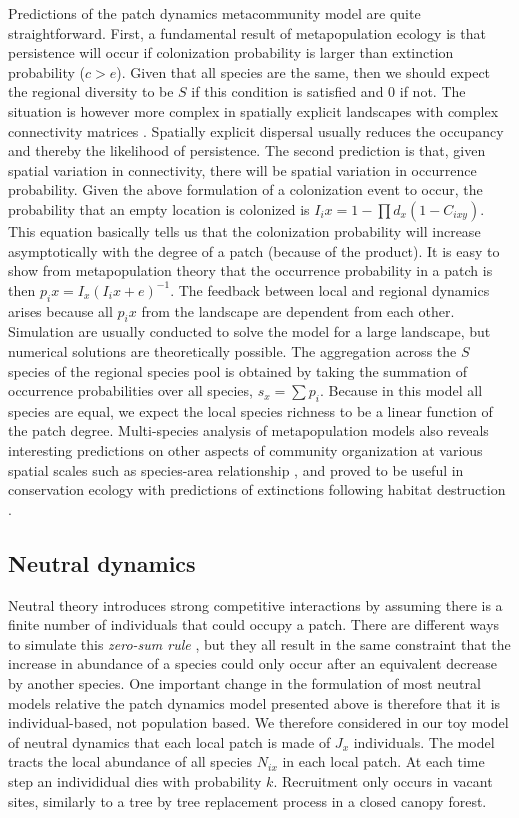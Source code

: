 \documentclass[12pt]{article}
\begin{document}
Predictions of the patch dynamics metacommunity model are quite straightforward.
First, a fundamental result of metapopulation ecology is that persistence will
occur if colonization probability is larger than extinction probability ($c>e$).
Given that all species are the same, then we should expect the regional
diversity to be $S$ if this condition is satisfied and $0$ if not. The situation
is however more complex in spatially explicit landscapes with complex
connectivity matrices \parencite{Hanski1998}. Spatially explicit dispersal
usually reduces the occupancy and thereby the likelihood of persistence. The
second prediction is that, given spatial variation in connectivity, there will
be spatial variation in occurrence probability. Given the above formulation of a
colonization event to occur, the probability that an empty location is colonized
is $I_ix=1-\prod d_x(1-C_{ixy})$. This equation basically tells us that the
colonization probability will increase asymptotically with the degree of a patch
(because of the product). It is easy to show from metapopulation theory that the
occurrence probability in a patch is then $p_ix=I_x(I_ix+e)^{-1}$. The feedback
between local and regional dynamics arises because all $p_ix$ from the landscape
are dependent from each other. Simulation are usually conducted to solve the
model for a large landscape, but numerical solutions are theoretically possible.
The aggregation across the $S$ species of the regional species pool is obtained
by taking the summation of occurrence probabilities over all species, $s_x =
\sum{p_i}$. Because in this model all species are equal, we expect the local
species richness to be a linear function of the patch degree. Multi-species
analysis of metapopulation models also reveals interesting predictions on other
aspects of community organization at various spatial scales such as species-area
relationship \parencite{Hanski1997}, and proved to be useful in conservation
ecology with predictions of extinctions following habitat destruction
\parencite{Nee1994,Rybicki2013}.

\subsection*{Neutral dynamics}

Neutral theory introduces strong competitive interactions by assuming there is a
finite number of individuals that could occupy a  patch. There are different
ways to simulate this \emph{zero-sum rule} \parencite{Bell2000,Hubbell2001}, but
they all result in the same constraint that the increase in abundance of a
species could only occur after an equivalent decrease by another species. One
important change in the formulation of most neutral models relative the patch
dynamics model presented above is therefore that it is individual-based, not
population based. We therefore considered in our toy model of neutral dynamics
that each local patch is made of $J_x$ individuals. The model tracts the local
abundance of all species $N_{ix}$ in each local patch. At each time step an
individidual dies with probability $k$. Recruitment only occurs in vacant sites,
similarly to a tree by tree replacement process in a closed canopy forest. 
\end{document}
